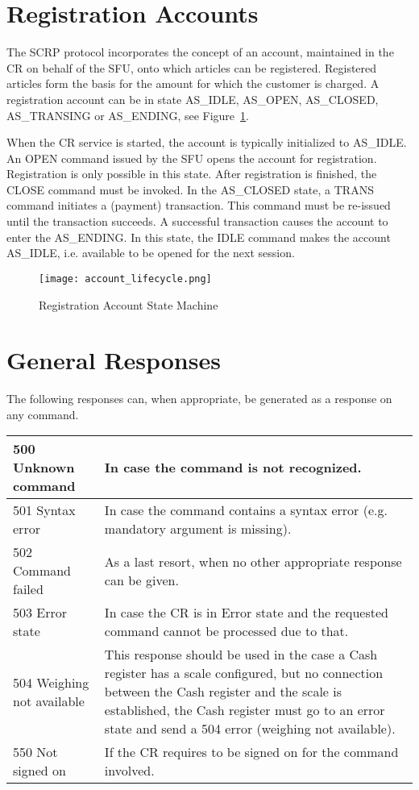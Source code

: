 \section*{Registration Accounts}
The SCRP protocol incorporates the concept of an account, maintained in the CR on behalf of the SFU, onto which articles can be registered. Registered articles form the basis for the amount for which the customer is charged. A registration account can be in state AS\_IDLE, AS\_OPEN, AS\_CLOSED, AS\_TRANSING or AS\_ENDING, see Figure~\ref{fig:account-lifecycle}.

When the CR service is started, the account is typically initialized to AS\_IDLE. An OPEN command issued by the SFU opens the account for registration. Registration is only possible in this state. After registration is finished, the CLOSE command must be invoked. In the AS\_CLOSED state, a TRANS command initiates a (payment) transaction. This command must be re-issued until the transaction succeeds. A successful transaction causes the account to enter the AS\_ENDING. In this state, the IDLE command makes the account AS\_IDLE, i.e. available to be opened for the next session.

\begin{figure}[ht]
  \begin{center}
    \texttt{[image: account\_lifecycle.png]}
  \end{center}
  \caption{Registration Account State Machine}
  \label{fig:account-lifecycle}
\end{figure}

\section*{General Responses}
The following responses can, when appropriate, be generated as a response on any command. 
\vspace{5px} \\
\begin{tabular}{| l | p{280px} |}
\hline
500 Unknown command & In case the command is not recognized. \\ \hline
501 Syntax error & In case the command contains a syntax error  (e.g. mandatory argument is missing). \\ \hline
502 Command failed & As a last resort, when no other appropriate response can be given. \\ \hline
503 Error state & In case the CR is in Error state and the requested command cannot be processed due to that. \\ \hline
504 Weighing not available & This response should be used in the case a Cash register has a scale configured, but no connection between the Cash register and the scale is established, the Cash register must go to an error state and send a 504 error (weighing not available). \\ \hline
550 Not signed on & If the CR requires to be signed on for the command involved. \\ 
\hline
\end{tabular}

